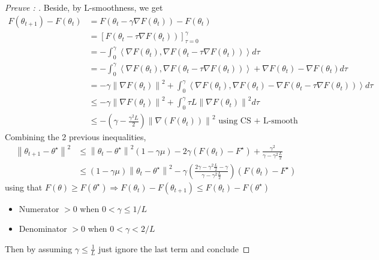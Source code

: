 \begin{note}
\begin{proof}[Preuve : ]
        Beside, by L-smoothness, we get 
        \begin{align*}
            F(\theta _{t+1}) - F(\theta _t) 
                &= F(\theta _t - \gamma \nabla F(\theta _t)) - F(\theta _t) \\
                &= [F(\theta _t - \tau \nabla F(\theta _t))]^\gamma _{\tau = 0} \\
                &= -\int_{0}^{\gamma } \left\langle \nabla F(\theta _t), \nabla F(\theta _t - \tau \nabla F(\theta _t)) \right\rangle d \tau \\
                &= -\int_{0}^{\gamma } \left\langle \nabla F(\theta _t), \nabla F(\theta _t - \tau \nabla F(\theta _t)) \right\rangle + \nabla F(\theta _t) - \nabla F(\theta _t) d \tau \\
                &= - \gamma \left\| \nabla F(\theta _t) \right\| ^2 + \int_{0}^{\gamma } \left\langle \nabla F(\theta _t), \nabla F(\theta _t) - \nabla F(\theta _t - \tau \nabla F(\theta _t)) \right\rangle d \tau \\
                &\leq - \gamma \left\| \nabla F(\theta _t)  \right\| ^2 + \int_{0}^{\gamma }\tau L \left\| \nabla F(\theta _t) \right\| ^2 d \tau  \\
                &\leq - (\gamma - \frac{\gamma ^2 L}{2}) \left\| \nabla (F(\theta _t )) \right\| ^2 \text{ using CS + L-smooth}
        \end{align*}
        Combining the 2 previous inequalities, 
        \begin{align*}
            \left\| \theta_{t+1} - \theta ^{\star} \right\|^2 &\leq  \left\| \theta_{t} - \theta ^{\star} \right\|^2 (1 - \gamma \mu ) - 2 \gamma (F(\theta_t) - F^{\star }) + \frac{\gamma ^2 }{\gamma - \gamma^2 \frac{L}{2}} \\
            &\leq (1 - \gamma \mu ) \left\| \theta_t - \theta ^\star  \right\| ^2 - \gamma ( \frac{2 \gamma - \gamma ^2 \frac{L}{2} - \gamma }{\gamma - \gamma ^2 \frac{L}{2}}) ( F(\theta _t ) - F^\star )
        \end{align*}
        using that $ F(\theta ) \geq F(\theta ^\star ) \Rightarrow F(\theta _t) - F(\theta _{t+1}) \leq F(\theta _t) - F(\theta ^\star ) $  
        \begin{itemize}
            \item Numerator $ > 0 $  when $ 0 < \gamma \leq 1/L $ 
            \item Denominator $ > 0 $  when $ 0 < \gamma < 2/L $ 
        \end{itemize}
        Then by assuming $ \gamma \leq \frac{1}{L} $ just ignore the last term and conclude
    \end{proof}
\end{note}



